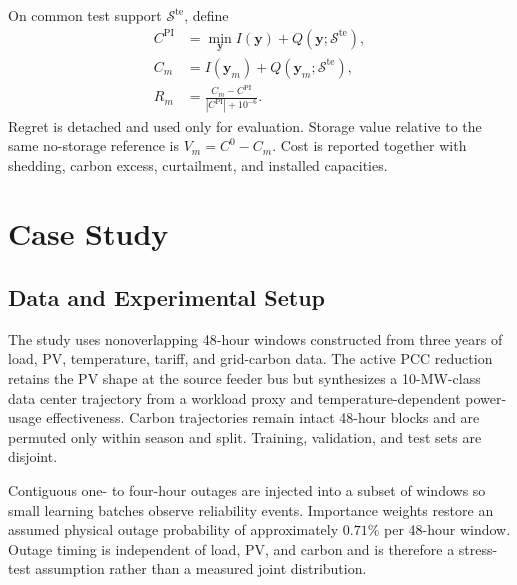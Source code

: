 \documentclass[times]{elsarticle}
\begin{document}
On common test support $\mathcal S^{\mathrm{te}}$, define
\begin{align}
C^{\mathrm{PI}}&=\min_{\bm y}I(\bm y)+Q(\bm y;\mathcal S^{\mathrm{te}}),
\label{eq:test_pi}\\
C_m&=I(\bm y_m)+Q(\bm y_m;\mathcal S^{\mathrm{te}}),
\label{eq:test_cost}\\
R_m&=\frac{C_m-C^{\mathrm{PI}}}{|C^{\mathrm{PI}}|+10^{-6}}.
\label{eq:regret}
\end{align}
Regret is detached and used only for evaluation. Storage value relative to the
same no-storage reference is $V_m=C^0-C_m$. Cost is reported together with
shedding, carbon excess, curtailment, and installed capacities.

\section{Case Study}
\label{sec:case}

\subsection{Data and Experimental Setup}

The study uses nonoverlapping 48-hour windows constructed from three years of
load, PV, temperature, tariff, and grid-carbon data. The active PCC reduction
retains the PV shape at the source feeder bus but synthesizes a 10-MW-class data
center trajectory from a workload proxy and temperature-dependent power-usage
effectiveness. Carbon trajectories remain intact 48-hour blocks and are
permuted only within season and split. Training, validation, and test sets are
disjoint.

Contiguous one- to four-hour outages are injected into a subset of windows so
small learning batches observe reliability events. Importance weights restore
an assumed physical outage probability of approximately $0.71\%$ per 48-hour
window. Outage timing is independent of load, PV, and carbon and is therefore a
stress-test assumption rather than a measured joint distribution.
\end{document}
